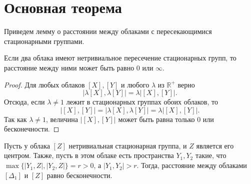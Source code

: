 \documentclass[11pt,twoside,draft
]{article}
\begin{document}
\section{Основная теорема}

Приведем лемму о расстоянии между облаками с пересекающимися стационарными группами.
\begin{lemma}
	Если два облака имеют нетривиальное пересечение стационарных групп,
	то расстояние между ними может быть равно $0$ или $\infty$.
	\label{lemmaDist}
\end{lemma}
\begin{proof}
	Для любых облаков $[X], [Y]$ и любого $\lambda$ из $\mathbb{R}^{+}$ верно
	\[\big|\lambda[X], \lambda[Y]\big| = \lambda\big|[X], [Y]\big|.\]
	Отсюда, если $\lambda \neq 1$ лежит в стационарных группах обоих облаков, то
	\[\big|[X],[Y]\big| = \big|\lambda[X], \lambda[Y]\big| = \lambda\big|[X], [Y]\big|.\]
	Так как $\lambda \neq 1$, величина $\big|[X],[Y]\big|$ может быть равна
	только $0$ или бесконечности.
\end{proof}
\begin{theorem} Пусть у облака $[Z]$ нетривиальная стационарная группа, и $Z$
	является его центром. Также, пусть в этом облаке есть пространства $Y_{1}, Y_{2}$
	такие, что $\max\big\{ |Y_{1},Z|, |Y_{2}, Z| \big\} = r>0$, а
	$|Y_{1}, Y_{2}|>r$. Тогда, расстояние между облаками $[\Delta_1]$ и $[Z]$
	равно бесконечности.
	\label{thrmDist}
\end{theorem} 
\end{document}
